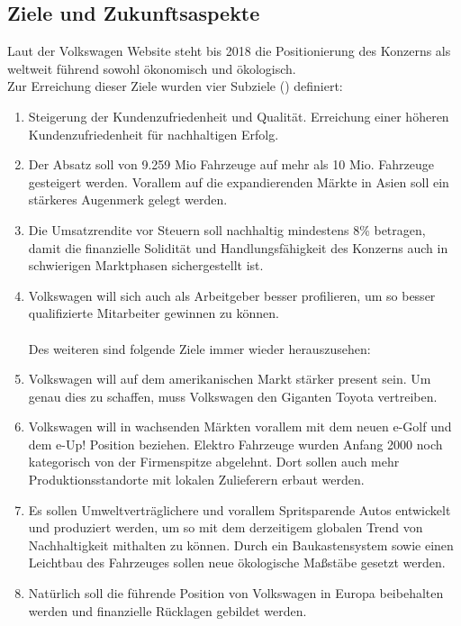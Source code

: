 \documentclass[12pt]{article}
\begin{document}
\subsection{Ziele und Zukunftsaspekte}
Laut der Volkswagen Website steht bis 2018 die Positionierung des Konzerns als weltweit führend sowohl ökonomisch und ökologisch.\\
Zur Erreichung dieser Ziele wurden vier Subziele (\cite{vwwebsitestrat}) definiert:
\begin{enumerate}
\item Steigerung der Kundenzufriedenheit und Qualität. Erreichung einer höheren Kundenzufriedenheit für nachhaltigen Erfolg.
\item Der Absatz soll von 9.259 Mio Fahrzeuge auf mehr als 10 Mio. Fahrzeuge gesteigert werden.  Vorallem auf die expandierenden Märkte in Asien soll ein stärkeres Augenmerk gelegt werden.
\item Die Umsatzrendite vor Steuern soll nachhaltig mindestens 8\% betragen, damit die finanzielle Solidität und Handlungsfähigkeit des Konzerns auch in schwierigen Marktphasen sichergestellt ist. %
\item Volkswagen will sich auch als Arbeitgeber besser profilieren, um so besser qualifizierte Mitarbeiter gewinnen zu können.  \\\\
Des weiteren sind folgende Ziele immer wieder herauszusehen: \\
\item Volkswagen will auf dem amerikanischen Markt stärker present sein. Um genau dies zu schaffen, muss Volkswagen den Giganten Toyota vertreiben. \cite{ec1}
\item Volkswagen will in wachsenden Märkten vorallem mit dem neuen e-Golf und dem e-Up! Position beziehen. Elektro Fahrzeuge wurden Anfang 2000 noch kategorisch von der Firmenspitze abgelehnt. \cite{ec3} Dort sollen auch mehr Produktionsstandorte mit lokalen Zulieferern erbaut werden. 
\item Es sollen Umweltverträglichere und vorallem Spritsparende Autos entwickelt und produziert werden, um so mit dem derzeitigem globalen Trend von Nachhaltigkeit mithalten zu können. Durch ein Baukastensystem sowie einen Leichtbau des Fahrzeuges sollen neue ökologische Maßstäbe gesetzt werden.
\item Natürlich soll die führende Position von Volkswagen in Europa beibehalten werden und finanzielle Rücklagen gebildet werden.
\end{enumerate}
\end{document}
